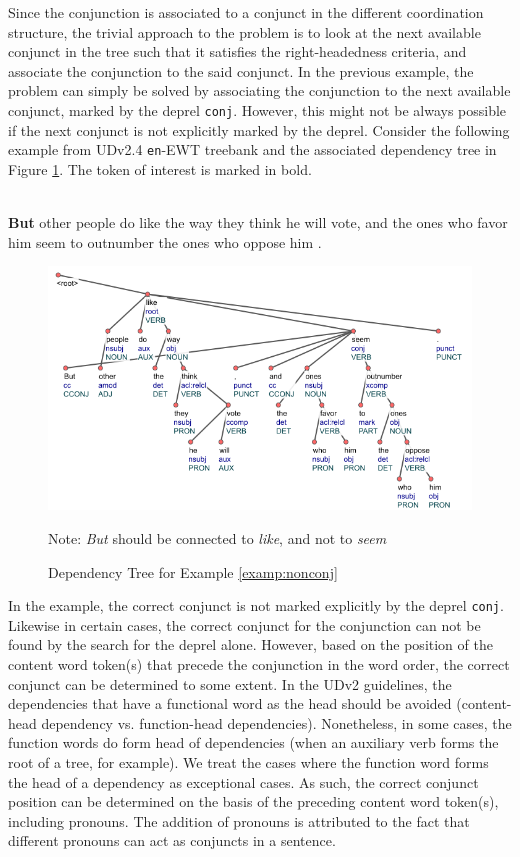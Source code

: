 Since the conjunction is associated to a conjunct in the different coordination structure, the trivial approach to the problem is to look at the next available conjunct in the tree such that it satisfies the right-headedness criteria, and associate the conjunction to the said conjunct. In the previous example, the problem can simply be solved by associating the conjunction to the next available conjunct, marked by the deprel \verb|conj|. However, this might not be always possible if the next conjunct is not explicitly marked by the deprel. Consider the following example from UDv2.4 \verb|en|-EWT treebank and the associated dependency tree in Figure \ref{fig:nonconj}. The token of interest is marked in bold.

\begin{example}
\label{examp:nonconj}
\textbf{}\\
\textbf{But} other people do like the way they think he will vote, and the ones who favor him seem to outnumber the ones who oppose him .
\end{example}

\begin{figure}[H]
    \centering
    \includegraphics[scale=0.75]{img/nonconj.png}
    \caption{Dependency Tree for Example \ref{examp:nonconj}}
    Note: \textit{But} should be connected to \textit{like}, and not to \textit{seem}
    \label{fig:nonconj}
\end{figure}

In the example, the correct conjunct is not marked explicitly by the deprel \verb|conj|. Likewise in certain cases, the correct conjunct for the conjunction can not be found by the search for the deprel alone. However, based on the position of the content word token(s) that precede the conjunction in the word order, the correct conjunct can be determined to some extent. In the UDv2 guidelines, the dependencies that have a functional word as the head should be avoided (content-head dependency vs. function-head dependencies). Nonetheless, in some cases, the function words do form head of dependencies (when an auxiliary verb forms the root of a tree, for example). We treat the cases where the function word forms the head of a dependency as exceptional cases. As such, the correct conjunct position can be determined on the basis of the preceding content word token(s), including pronouns. The addition of pronouns is attributed to the fact that different pronouns can act as conjuncts in a sentence.

